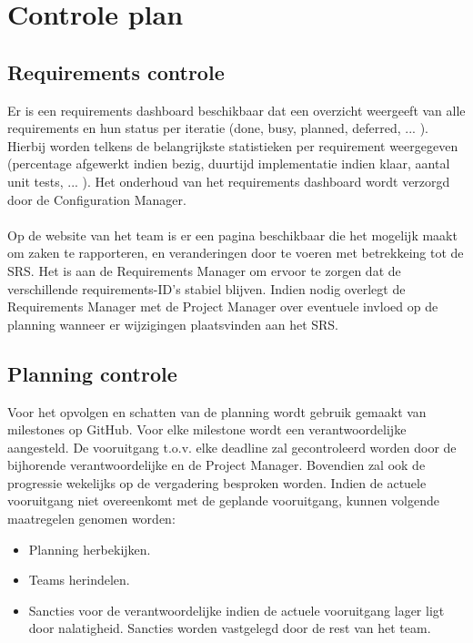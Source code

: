 \section{Controle plan}
\subsection{Requirements controle} \label{RequirementsControlPlan}
Er is een requirements dashboard beschikbaar dat een overzicht weergeeft van alle requirements en hun status per iteratie (done, busy, planned, deferred, ... ). Hierbij worden telkens de belangrijkste statistieken per requirement weergegeven (percentage afgewerkt indien bezig, duurtijd implementatie indien klaar, aantal unit tests, ... ). Het onderhoud van het requirements dashboard wordt verzorgd door de Configuration Manager.
\\
\\
Op de website van het team \cite{portalWebsite} is er een pagina beschikbaar die het mogelijk maakt om zaken te rapporteren, en veranderingen door te voeren met betrekkeing tot de SRS. Het is aan de Requirements Manager om ervoor te zorgen dat de verschillende requirements-ID's stabiel blijven. Indien nodig overlegt de Requirements Manager met de Project Manager over eventuele invloed op de planning wanneer er wijzigingen plaatsvinden aan het SRS.

\subsection{Planning controle} \label{sec:PlanningControle}
Voor het opvolgen en schatten van de planning wordt gebruik gemaakt van milestones op GitHub.  Voor elke milestone wordt een verantwoordelijke aangesteld. De vooruitgang t.o.v. elke deadline zal gecontroleerd worden door de bijhorende verantwoordelijke en de Project Manager. Bovendien zal ook de progressie wekelijks op de vergadering besproken worden. Indien de actuele vooruitgang niet overeenkomt met de geplande vooruitgang, kunnen volgende maatregelen genomen worden:
\begin{itemize}
	\item Planning herbekijken.
	\item Teams herindelen.
	\item Sancties voor de verantwoordelijke indien de actuele vooruitgang lager ligt door nalatigheid. Sancties worden vastgelegd door de rest van het team.
\end{itemize} 

